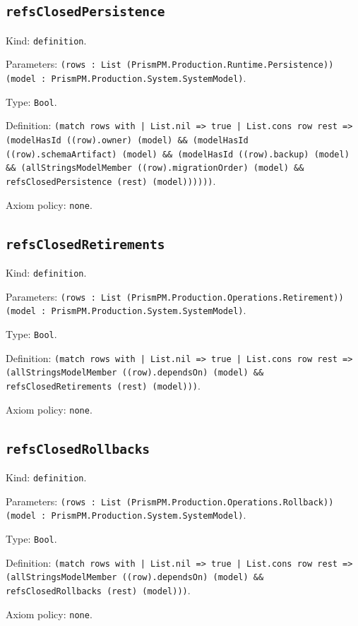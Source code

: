 \documentclass[11pt]{article}
\begin{document}
\subsection*{\texttt{refsClosedPersistence}}
\noindent Kind: \texttt{definition}.\par
\noindent Parameters: \texttt{(rows : List (PrismPM.Production.Runtime.Persistence)) (model : PrismPM.Production.System.SystemModel)}.\par
\noindent Type: \texttt{Bool}.\par
\noindent Definition: \texttt{(match rows with | List.nil => true | List.cons row rest => (modelHasId ((row).owner) (model) \&\& (modelHasId ((row).schemaArtifact) (model) \&\& (modelHasId ((row).backup) (model) \&\& (allStringsModelMember ((row).migrationOrder) (model) \&\& refsClosedPersistence (rest) (model))))))}.\par
\noindent Axiom policy: \texttt{none}.\par
\subsection*{\texttt{refsClosedRetirements}}
\noindent Kind: \texttt{definition}.\par
\noindent Parameters: \texttt{(rows : List (PrismPM.Production.Operations.Retirement)) (model : PrismPM.Production.System.SystemModel)}.\par
\noindent Type: \texttt{Bool}.\par
\noindent Definition: \texttt{(match rows with | List.nil => true | List.cons row rest => (allStringsModelMember ((row).dependsOn) (model) \&\& refsClosedRetirements (rest) (model)))}.\par
\noindent Axiom policy: \texttt{none}.\par
\subsection*{\texttt{refsClosedRollbacks}}
\noindent Kind: \texttt{definition}.\par
\noindent Parameters: \texttt{(rows : List (PrismPM.Production.Operations.Rollback)) (model : PrismPM.Production.System.SystemModel)}.\par
\noindent Type: \texttt{Bool}.\par
\noindent Definition: \texttt{(match rows with | List.nil => true | List.cons row rest => (allStringsModelMember ((row).dependsOn) (model) \&\& refsClosedRollbacks (rest) (model)))}.\par
\noindent Axiom policy: \texttt{none}.\par
\end{document}
